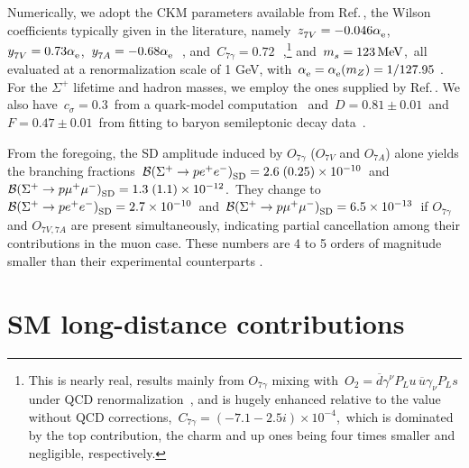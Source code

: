 \documentclass[amsmath,amssymb,aps,nofootinbib,prd,preprint,superscriptaddress,tightenlines,a4paper,bm]{revtex4-2}
\begin{document}
Numerically, we adopt the CKM parameters available from Ref.\,\cite{Workman:2022ynf}, the Wilson coefficients typically given in the literature, namely
\,$z_{7V}^{} = -0.046\alpha_{\rm e}^{}$,  \,$y_{7V}^{} = 0.73\alpha_{\rm e}^{}$, \,$y_{7A}^{} = -0.68\alpha_{\rm e}^{}$\,~\cite{Buchalla:1995vs,Neshatpour:2022fak}, and \,$C_{7\gamma}=0.72$\,~\cite{Nielsen:1995dp,Tandean:1999mg},\footnote{This is nearly real, results mainly from $O_{7\gamma}$ mixing with \,$O_2=\overline d\gamma^\nu P_L^{}u\,\overline u\gamma_\nu^{}P_L^{}s$\, under QCD renormalization~\cite{Buchalla:1995vs}, and is hugely enhanced relative to the value without QCD corrections, \,$C_{7\gamma}=(-7.1-2.5i)\times10^{-4}$,\, which is dominated by the top contribution, the charm and up ones being four times smaller and negligible, respectively.} and \,$m_s^{}=123\rm\,MeV$,\, all evaluated at a renormalization scale of 1\,\,GeV, with \,$\alpha_{\rm e}^{} = \alpha_{\rm e}^{}(m_Z) = 1/127.95$ \cite{Workman:2022ynf}.
For the $\Sigma^+$ lifetime and hadron masses, we employ the ones supplied by Ref.\,\cite{Workman:2022ynf}.
We also have \,$c_\sigma^{}=0.3$\, from a quark-model computation~\cite{Donoghue:2022wrw} and \,$
D = 0.81\pm0.01$\, and \,$F = 0.47\pm0.01$\, from fitting to baryon semileptonic decay data~\cite{Workman:2022ynf}.

From the foregoing, the SD amplitude induced by $O_{7\gamma}$ ($O_{7V}$ and $O_{7A}$) alone yields the branching fractions \,${\cal B}(\Sigma^+\to pe^+e^-)_{\rm SD}^{} = 2.6\;(0.25)\times10^{-10}$\, and \,${\cal B}(\Sigma^+\to p\mu^+\mu^-)_{\rm SD}^{}=1.3\;(1.1)\times10^{-12}$.\,
They change to \,${\cal B}(\Sigma^+\to pe^+e^-)_{\rm SD}^{} = 2.7\times10^{-10}$\, and \,${\cal B}(\Sigma^+\to p\mu^+\mu^-)_{\rm SD}^{} = 6.5\times10^{-13}$\, if $O_{7\gamma}$ and $O_{7V,7A}$ are present simultaneously, indicating partial cancellation among their contributions in the muon case.
These numbers are 4 to 5 orders of magnitude smaller than their experimental counterparts \cite{Workman:2022ynf,Ang:1969hg,HyperCP:2005mvo,LHCb:2017rdd}.

\section{SM long-distance contributions\label{ld}}
\end{document}

